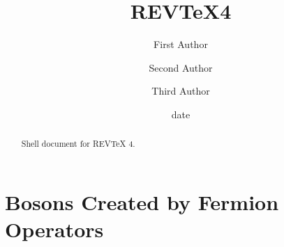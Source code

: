 \documentclass[aps,preprint]{revtex4}%
\begin{document}
\title[Short title for running header]{REV\TeX4}
\author{First Author}
\author{Second Author}
\author{Third Author}

\begin{abstract}
Shell document for REV\TeX{} 4.

\end{abstract}
\date[Date text]{date}




\maketitle
\tableofcontents


\section{Bosons Created by Fermion Operators}
\end{document}
